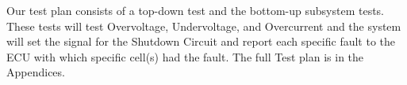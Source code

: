 Our test plan consists of a top-down test and the bottom-up subsystem tests. These tests will test Overvoltage, Undervoltage, and Overcurrent and the system will set the signal for the Shutdown Circuit and report each specific fault to the ECU with which specific cell(s) had the fault. The full Test plan is in the Appendices.
